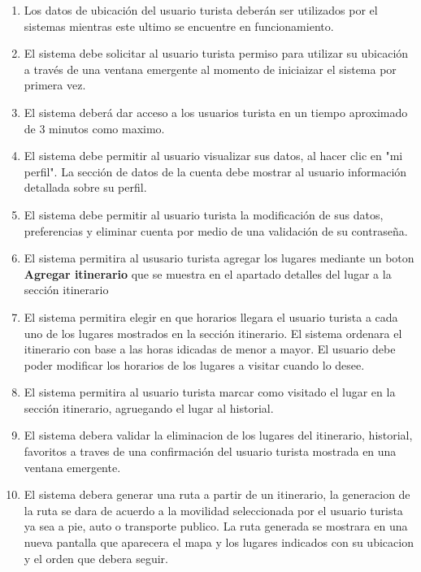 \documentclass{article}
\begin{document}
\begin{enumerate}
    \item Los datos de ubicación del usuario turista deberán ser utilizados por el sistemas mientras este ultimo se encuentre en funcionamiento.
    
    \item El sistema debe solicitar al usuario turista permiso para utilizar su ubicación a través de una ventana emergente al momento de iniciaizar el sistema por primera vez.
    
    \item El sistema deberá dar acceso a los usuarios turista en un tiempo aproximado de 3 minutos como maximo.

\item El sistema debe permitir al usuario visualizar sus datos, al hacer clic en "mi perfil". La sección de datos
de la cuenta debe mostrar al usuario información detallada sobre su perfil.

\item El sistema debe permitir al usuario turista la modificación de sus datos, preferencias y eliminar cuenta por medio de una validación de su contraseña. 

\item El sistema permitira al ususario turista agregar los lugares mediante un boton \textbf{Agregar itinerario} que se muestra en el apartado detalles del lugar a la sección itinerario

\item El sistema permitira elegir en que horarios llegara el usuario turista a cada uno de los lugares mostrados en la sección itinerario. El sistema ordenara el itinerario con base a las horas idicadas de menor a mayor. El usuario debe poder modificar los horarios de los lugares a visitar cuando lo desee.

\item El sistema permitira al usuario turista marcar como visitado el lugar en la sección itinerario, agruegando el lugar al historial.

\item  El sistema debera validar la eliminacion de los lugares del itinerario, historial, favoritos a traves de una confirmación del usuario turista mostrada en una ventana emergente.

\item El sistema debera generar una ruta a partir de un itinerario, la generacion de la ruta se dara de acuerdo a la movilidad seleccionada por el usuario turista ya sea a pie, auto o transporte publico. La ruta generada se mostrara en una nueva pantalla que aparecera el mapa y los lugares indicados con su ubicacion y el orden que debera seguir.


\end{enumerate}
\end{document}
